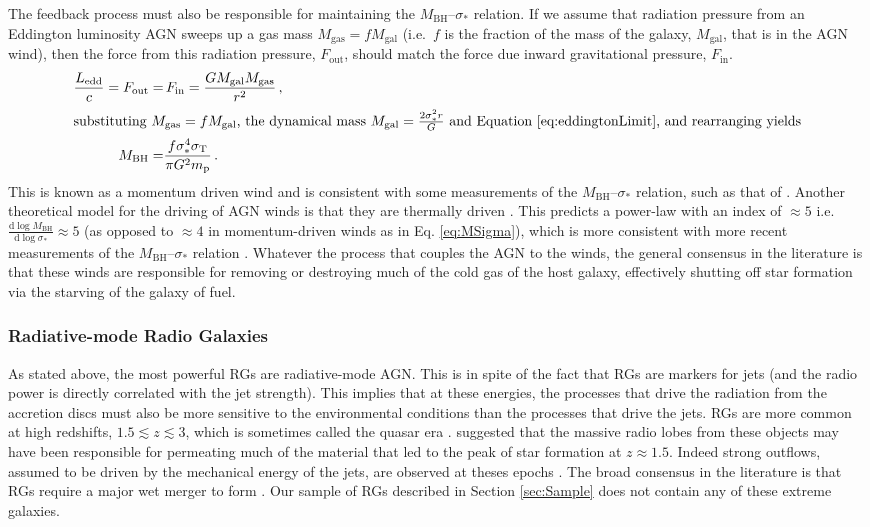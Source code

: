 			The feedback process must also be responsible for maintaining the $M_\text{BH}$--$\sigma_\ast$ relation. If we assume that radiation pressure from an Eddington luminosity AGN sweeps up a gas mass $M_\text{gas} = f M_\text{gal}$ (i.e.\ $f$ is the fraction of the mass of the galaxy, $M_\text{gal}$, that is in the AGN wind), then the force from this radiation pressure, $F_\text{out}$, should match the force due inward gravitational pressure, $F_\text{in}$.
			\begin{align}
				\frac{L_\text{edd}}{c} = F_\mathrm{out} = & \, F_\text{in} = \frac{G M_\text{gal} M_\text{gas}}{r^2} \, , \\
				\intertext{substituting $M_\text{gas} = f M_\text{gal}$, the dynamical mass $M_\text{gal} = \frac{2\sigma_\ast^2 r}{G}$ and Equation \ref{eq:eddingtonLimit}, and rearranging yields}
				M_\text{BH} = & \frac{f \sigma_\ast^4 \sigma_\mathrm{T}}{\pi G^2 m_\mathrm{p}} \, .
				\label{eq:MSigma}
			\end{align}
			This is known as a momentum driven wind \citep[e.g.][]{Fabian1999} and is consistent with some measurements of the $M_\text{BH}$--$\sigma_\ast$ relation, such as that of \citet{Gultekin2009}.
			Another theoretical model for the driving of AGN winds is that they are thermally driven \citep{Silk1998}. This predicts a power-law with an index of $\approx 5$ i.e.\ $\frac{\mathrm{d} \log M_\mathrm{BH}}{\mathrm{d}\log \sigma_\ast} \approx 5$ (as opposed to $\approx 4$ in momentum-driven winds as in Eq. \ref{eq:MSigma}), which is more consistent with more recent measurements of the $M_\mathrm{BH}$--$\sigma_\ast$ relation \citep[e.g.][]{McConnell2013}. 
			Whatever the process that couples the AGN to the winds, the general consensus in the literature is that these winds are responsible for removing or destroying much of the cold gas of the host galaxy, effectively shutting off star formation via the starving of the galaxy of fuel. 
		\subsubsection{Radiative-mode Radio Galaxies}
			\label{subsubsec:RadiativeRadio}
			As stated above, the most powerful RGs are radiative-mode AGN. This is in spite of the fact that RGs are markers for jets (and the radio power is directly correlated with the jet strength). This implies that at these energies, the processes that drive the radiation from the accretion discs must also be more sensitive to the environmental conditions than the processes that drive the jets. RGs are more common at high redshifts, $1.5 \lesssim z \lesssim 3$, which is sometimes called the quasar era \citep{Miley2008}. \citet{Gopal-Krishna2001} suggested that the massive radio lobes from these objects may have been responsible for permeating much of the material that led to the peak of star formation at $z \approx 1.5$. Indeed strong outflows, assumed to be driven by the mechanical energy of the jets, are observed at theses epochs \citep[e.g.][]{Nesvadba2008, Maiolino2012}.
			The broad consensus in the literature is that RGs require a major wet merger to form \citep[e.g.][]{Malin1983, Quillen1992, Lim2000}. Our sample of RGs described in Section \ref{sec:Sample} does not contain any of these extreme galaxies.
